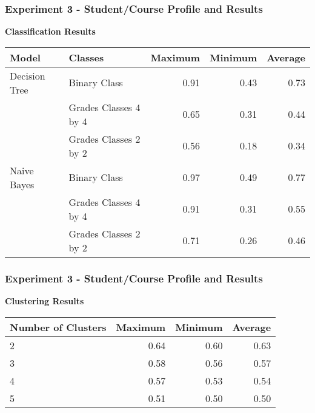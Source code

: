 \begin{frame}
\frametitle{Experiment 3 - Student/Course Profile and Results}

\textbf{Classification Results}

\vspace{0.5cm}

{

\small
\centering

\begin{tabular}{| l | l | r | r | r |}
    \hline
    \textbf{Model} & \textbf{Classes} & \textbf{Maximum} & \textbf{Minimum} & \textbf{Average} \\ \hline
    Decision Tree & Binary Class          & 0.91 & 0.43 & 0.73 \\
                  & Grades Classes 4 by 4 & 0.65 & 0.31 & 0.44 \\
                  & Grades Classes 2 by 2 & 0.56 & 0.18 & 0.34 \\ \hline
    Naive Bayes   & Binary Class          & 0.97 & 0.49 & 0.77 \\
                  & Grades Classes 4 by 4 & 0.91 & 0.31 & 0.55 \\
                  & Grades Classes 2 by 2 & 0.71 & 0.26 & 0.46 \\ \hline
\end{tabular}

}

\end{frame}

\begin{frame}
\frametitle{Experiment 3 - Student/Course Profile and Results}

\textbf{Clustering Results}

\vspace{0.5cm}

{

\small
\centering

\begin{tabular}{| l | r | r | r |}
    \hline
    \textbf{Number of Clusters} & \textbf{Maximum} & \textbf{Minimum} & \textbf{Average} \\ \hline
    2 & 0.64 & 0.60 & 0.63 \\ \hline
    3 & 0.58 & 0.56 & 0.57 \\ \hline
    4 & 0.57 & 0.53 & 0.54 \\ \hline
    5 & 0.51 & 0.50 & 0.50 \\ \hline
\end{tabular}

}

\end{frame}
